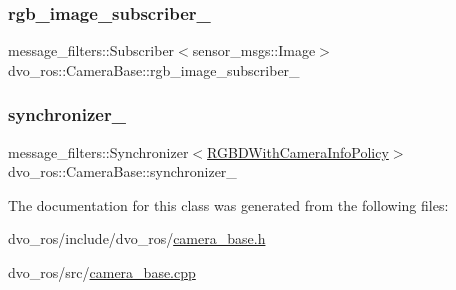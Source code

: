 \mbox{\label{classdvo__ros_1_1_camera_base_a38d299b1c046830ef1552a0e4a31d7b2}} 
\subsubsection{\texorpdfstring{rgb\+\_\+image\+\_\+subscriber\+\_\+}{rgb\_image\_subscriber\_}}
{\footnotesize\ttfamily message\+\_\+filters\+::\+Subscriber$<$sensor\+\_\+msgs\+::\+Image$>$ dvo\+\_\+ros\+::\+Camera\+Base\+::rgb\+\_\+image\+\_\+subscriber\+\_\+\hspace{0.3cm}{\ttfamily [protected]}}

\mbox{\label{classdvo__ros_1_1_camera_base_aac780a822e3a2b6779a2a9598b0b52d2}} 
\subsubsection{\texorpdfstring{synchronizer\+\_\+}{synchronizer\_}}
{\footnotesize\ttfamily message\+\_\+filters\+::\+Synchronizer$<$\mbox{\hyperlink{namespacedvo__ros_ae8c4d74734d4ef3107bf429ef461e553}{R\+G\+B\+D\+With\+Camera\+Info\+Policy}}$>$ dvo\+\_\+ros\+::\+Camera\+Base\+::synchronizer\+\_\+\hspace{0.3cm}{\ttfamily [protected]}}



The documentation for this class was generated from the following files\+:\begin{DoxyCompactItemize}
\item 
dvo\+\_\+ros/include/dvo\+\_\+ros/\mbox{\hyperlink{camera__base_8h}{camera\+\_\+base.\+h}}\item 
dvo\+\_\+ros/src/\mbox{\hyperlink{camera__base_8cpp}{camera\+\_\+base.\+cpp}}\end{DoxyCompactItemize}
